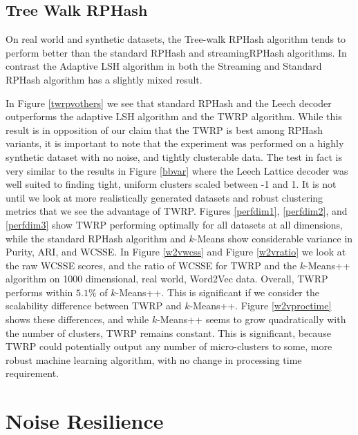 \subsection{Tree Walk RPHash}

On real world and synthetic datasets, the Tree-walk RPHash algorithm tends to perform better than
the standard \textsf{RPHash} and \textsf{streamingRPHash} algorithms.  In contrast the Adaptive LSH algorithm
in both the Streaming and Standard \textsf{RPHash} algorithm has a slightly mixed result.

In Figure \ref{twrpvothers} we see that standard \textsf{RPHash} and the Leech decoder outperforms the
adaptive LSH algorithm and the \textsf{TWRP} algorithm.  While this result is in opposition of our claim that
the \textsf{TWRP} is best among \textsf{RPHash} variants, it is important to note that the experiment was performed on
a highly synthetic dataset with no noise, and tightly clusterable data.  The test in fact is very
similar to the results in Figure \ref{bbvar} where the Leech Lattice decoder was well suited to
finding tight, uniform clusters scaled between -1 and 1.  It is not until we look at more
realistically generated datasets and robust clustering metrics that we see the advantage of \textsf{TWRP}.
Figures \ref{perfdim1}, \ref{perfdim2}, and \ref{perfdim3} show \textsf{TWRP} performing optimally for all
datasets at all dimensions, while the standard \textsf{RPHash} algorithm and $k$-Means show considerable
variance in Purity, ARI, and WCSSE.  In Figure \ref{w2vwcss} and Figure \ref{w2vratio} we look at the raw
WCSSE scores, and the ratio of WCSSE for \textsf{TWRP} and the $k$-Means++ algorithm on 1000 dimensional,
real world, Word2Vec data.  Overall, \textsf{TWRP} performs within $5.1\%$ of $k$-Means++.  This is significant
if we consider the scalability difference between \textsf{TWRP} and $k$-Means++.  Figure \ref{w2vproctime}
shows these differences, and while $k$-Means++ seems to grow quadratically with the number of
clusters, \textsf{TWRP} remains constant.  This is significant, because \textsf{TWRP} could potentially output any
number of micro-clusters to some, more robust machine learning algorithm, with no change in
processing time requirement.

\section{Noise Resilience}

